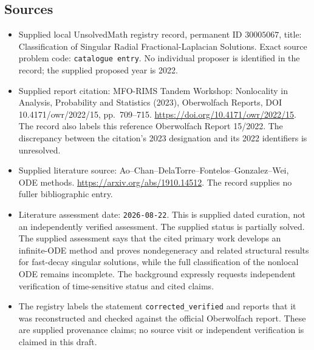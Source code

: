 \documentclass[11pt]{article}
\begin{document}
\subsection{Sources}
\begin{itemize}
\item Supplied local UnsolvedMath registry record, permanent ID \(30005067\), title: Classification of Singular Radial Fractional-Laplacian Solutions. Exact source problem code: \texttt{catalogue entry}. No individual proposer is identified in the record; the supplied proposed year is 2022.
\item Supplied report citation: MFO-RIMS Tandem Workshop: Nonlocality in Analysis, Probability and Statistics (2023), Oberwolfach Reports, DOI 10.4171/owr/2022/15, pp.\ 709--715. \url{https://doi.org/10.4171/owr/2022/15}. The record also labels this reference Oberwolfach Report 15/2022. The discrepancy between the citation's 2023 designation and its 2022 identifiers is unresolved.
\item Supplied literature source: Ao--Chan--DelaTorre--Fontelos--Gonzalez--Wei, ODE methods. \url{https://arxiv.org/abs/1910.14512}. The record supplies no fuller bibliographic entry.
\item Literature assessment date: \texttt{2026-08-22}. This is supplied dated curation, not an independently verified assessment. The supplied status is partially solved. The supplied assessment says that the cited primary work develops an infinite-ODE method and proves nondegeneracy and related structural results for fast-decay singular solutions, while the full classification of the nonlocal ODE remains incomplete. The background expressly requests independent verification of time-sensitive status and cited claims.
\item The registry labels the statement \texttt{corrected\_verified} and reports that it was reconstructed and checked against the official Oberwolfach report. These are supplied provenance claims; no source visit or independent verification is claimed in this draft.
\end{itemize}
\end{document}
